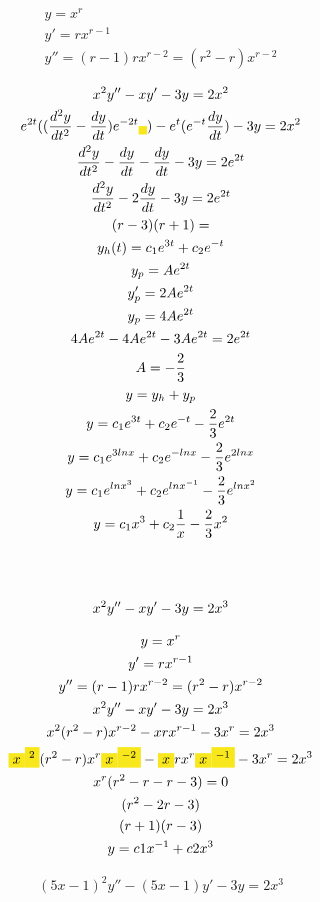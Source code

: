 \documentclass{article}
\begin{document}
\begin{gather*}
y = x^{r} \\
y' = rx^{r-1} \\
y'' = (r-1)rx^{r-2} = (r^{2}-r)x^{r-2} 
\end{gather*}





\begin{gather*}
x^{2}y''-xy'-3y = 2x^{2} \\
e^{2t}((\frac{d^{2}y}{dt^{2}}-\frac{dy}{dt})e^{-2t}\text{\colorbox[RGB]{248,231,28}{$ $}})-e^{t}(e^{-t}\frac{dy}{dt})-3y = 2x^{2} \\
\frac{d^{2}y}{dt^{2}}-\frac{dy}{dt}-\frac{dy}{dt}-3y = 2e^{2t} \\
\frac{d^{2}y}{dt^{2}}-2\frac{dy}{dt}-3y =2e^{2t} \\
(r -3)(r +1) = \\
y_{h}(t) = c_{1}e^{3t}+c_{2}e^{-t} \\
y_{p} = Ae^{2t} \\
y_{p}' = 2Ae^{2t} \\
y_{p} = 4Ae^{2t} \\
 4Ae^{2t}-4Ae^{2t}-3Ae^{2t} = 2e^{2t} \\
A =-\frac{2}{3}  \\
y = y_{h}+y_{p} \\
y=c_{1}e^{3t}+c_{2}e^{-t}-\frac{2}{3} e^{2t} \\
y=c_{1}e^{3lnx}+c_{2}e^{-lnx}-\frac{2}{3} e^{2lnx} \\
y=c_{1}e^{lnx^{3}}+c_{2}e^{lnx^{-1}}-\frac{2}{3} e^{lnx^{2}} \\
y=c_{1}x^{3}+c_{2}\frac{1}{x}-\frac{2}{3} x^{2} \\
\vspace{0.5em} \\
\vspace{0.5em} \\
x^{2}y''-xy'-3y = 2x^{3}
\end{gather*}





\begin{gather*}
y = x^{r} \\
y'= rx^{r-1} \\
y'' = (r-1)rx^{r-2} = (r^{2}-r)x^{r-2}  \\
x^{2}y''-xy'-3y = 2x^{3} \\
x^{2}(r^{2}-r)x^{r-2}-xrx^{r-1}-3x^{r}= 2x^{3} \\
\text{\colorbox[RGB]{248,231,28}{$x$}}\text{\colorbox[RGB]{248,231,28}{$^{2}$}}(r^{2}-r)x^{r}\text{\colorbox[RGB]{248,231,28}{$x$}}\text{\colorbox[RGB]{248,231,28}{$^{-2}$}}-\text{\colorbox[RGB]{248,231,28}{$x$}}rx^{r}\text{\colorbox[RGB]{248,231,28}{$x$}}\text{\colorbox[RGB]{248,231,28}{$^{-1}$}}-3x^{r} = 2x^{3} \\
x^{r}(r^{2}-r-r-3) = 0 \\
(r^{2}-2r-3) \\
(r+1)(r-3)  \\
y=  c1x^{-1}+c2x^{3}
\end{gather*}



\begin{gather*}
(5x-1)^{2}y''-(5x-1)y'-3y = 2x^{3}
\end{gather*}
\end{document}
